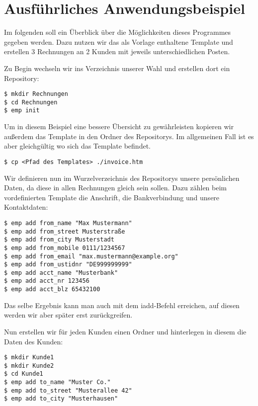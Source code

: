 

\section{Ausführliches Anwendungsbeispiel}
Im folgenden soll ein Überblick über die Möglichkeiten dieses Programmes gegeben werden. Dazu nutzen wir das als Vorlage enthaltene Template und erstellen 3 Rechnungen an 2 Kunden mit jeweils unterschiedlichen Posten.

Zu Begin wechseln wir ins Verzeichnis unserer Wahl und erstellen dort ein Repository:
\begin{lstlisting}[style=Bash]
$ mkdir Rechnungen
$ cd Rechnungen
$ emp init
\end{lstlisting}

Um in diesem Beispiel eine bessere Übersicht zu gewährleisten kopieren wir außerdem das Template in den Ordner des Repositorys. Im allgemeinen Fall ist es aber gleichgültig wo sich das Template befindet.
\begin{lstlisting}[style=Bash]
$ cp <Pfad des Templates> ./invoice.htm
\end{lstlisting}


Wir definieren nun im Wurzelverzeichnis des Repositorys unsere persönlichen Daten, da diese in allen Rechnungen gleich sein sollen. Dazu zählen beim vordefinierten Template die Anschrift, die Bankverbindung und unsere Kontaktdaten:

\begin{lstlisting}[style=Bash]
$ emp add from_name "Max Mustermann"
$ emp add from_street Musterstraße
$ emp add from_city Musterstadt
$ emp add from_mobile 0111/1234567
$ emp add from_email "max.mustermann@example.org"
$ emp add from_ustidnr "DE999999999"
$ emp add acct_name "Musterbank"
$ emp add acct_nr 123456
$ emp add acct_blz 65432100
\end{lstlisting}

Das selbe Ergebnis kann man auch mit dem iadd-Befehl erreichen, auf diesen werden wir aber später erst zurückgreifen.


Nun erstellen wir für jeden Kunden einen Ordner und hinterlegen in diesem die Daten des Kunden:
\begin{lstlisting}[style=Bash]
$ mkdir Kunde1
$ mkdir Kunde2
$ cd Kunde1
$ emp add to_name "Muster Co."
$ emp add to_street "Musterallee 42"
$ emp add to_city "Musterhausen"
\end{lstlisting}


